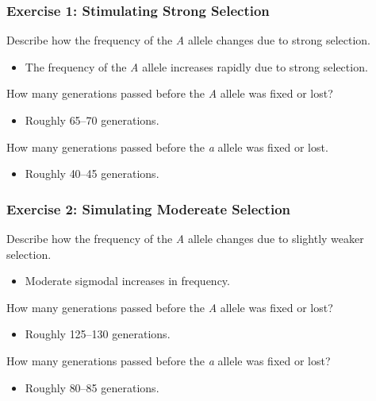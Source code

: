 \documentclass[12pt,a4paper]{article}
\begin{document}
\begin{enumerate}
    \subsubsection*{Exercise 1: Stimulating Strong Selection}
    {\color{darklc}\item  Describe how the frequency of the \textit{A} allele changes due to strong selection.}
        \begin{itemize}
            \item The frequency of the \textit{A} allele {\color{pos}increases rapidly} due to strong selection.
        \end{itemize}
    {\color{darklc}\item How many generations passed before the \textit{A} allele was fixed or lost?}
        \begin{itemize}
            \item Roughly {\color{o-Sun}65--70} generations.
        \end{itemize}
    {\color{darklc}\item How many generations passed before the \textit{a} allele was fixed or lost.}
        \begin{itemize}
            \item Roughly {\color{o-Sun}40--45} generations.
        \end{itemize}
    \subsubsection*{Exercise 2: Simulating Modereate Selection}
    {\color{darklc}\item Describe how the frequency of the \textit{A} allele changes due to slightly weaker selection.}
        \begin{itemize}
            \item Moderate sigmodal increases in frequency.
        \end{itemize}
    {\color{darklc}\item How many generations passed before the \textit{A} allele was fixed or lost?}
        \begin{itemize}
            \item Roughly {\color{o-Sun}125--130} generations.
        \end{itemize}
    {\color{darklc}\item How many generations passed before the \textit{a} allele was fixed or lost?}
        \begin{itemize}
            \item Roughly {\color{o-Sun}80--85} generations.
        \end{itemize}

\end{enumerate}
\end{document}
